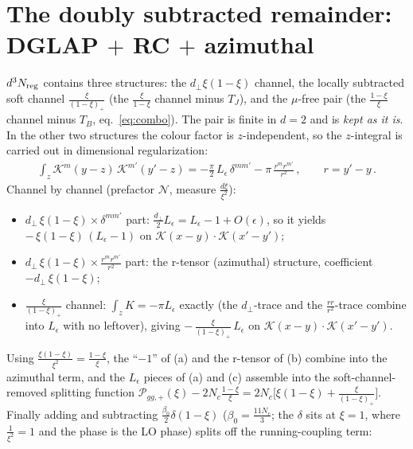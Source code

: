 \documentclass[9pt]{article}
\newcommand{\Leps}{L_{\epsilon}}
\newcommand{\KK}{\mathcal K(x-y)\!\cdot\!\mathcal K(x'-y')}
\begin{document}
\section{The doubly subtracted remainder: DGLAP $+$ RC $+$ azimuthal}
$d^{3}N_{\rm reg}$ contains three structures: the $d_{\perp}\xi(1-\xi)$ channel, the locally
subtracted soft channel $\frac{\xi}{(1-\xi)_{+}}$ (the $\frac{\xi}{1-\xi}$ channel minus
$T_{J}$), and the $\mu$-free pair (the $\frac{1-\xi}{\xi}$ channel minus $T_{B}$,
eq.~\eqref{eq:combo}). The pair is finite in $d=2$ and is \emph{kept as it is}. In the other
two structures the colour factor is $z$-independent, so the $z$-integral is carried out in
dimensional regularization:
\begin{align}
\int_{z}\mathcal K^{m}(y-z)\,\mathcal K^{m'}(y'-z)
=-\frac{\pi}{2}\,\Leps\,\delta^{mm'}-\pi\,\frac{r^{m}r^{m'}}{r^{2}}\,,\qquad r=y'-y\,.
\end{align}
Channel by channel (prefactor $\mathcal N$, measure $\frac{d\xi}{\xi^{2}}$):
\begin{itemize}
\item[(a)] $d_{\perp}\,\xi(1-\xi)\times\delta^{mm'}$ part:
$\frac{d_{\perp}}{2}\Leps=\Leps-1+O(\epsilon)$, so it yields
$-\,\xi(1-\xi)\,(\Leps-1)$ on $\KK$;
\item[(b)] $d_{\perp}\,\xi(1-\xi)\times\frac{r^{m}r^{m'}}{r^{2}}$ part: the r-tensor
(azimuthal) structure, coefficient $-d_{\perp}\,\xi(1-\xi)$;
\item[(c)] $\frac{\xi}{(1-\xi)_{+}}$ channel: $\int_{z}K=-\pi\Leps$ exactly (the
$d_{\perp}$-trace and the $\frac{r r}{r^{2}}$-trace combine into $\Leps$ with no leftover),
giving $-\,\frac{\xi}{(1-\xi)_{+}}\,\Leps$ on $\KK$.
\end{itemize}
Using $\frac{\xi(1-\xi)}{\xi^{2}}=\frac{1-\xi}{\xi}$, the ``$-1$'' of (a) and the r-tensor of
(b) combine into the azimuthal term, and the $\Leps$ pieces of (a) and (c) assemble into the
soft-channel-removed splitting function
$\mathcal P_{gg,+}(\xi)-2N_{c}\frac{1-\xi}{\xi}
=2N_{c}\big[\xi(1-\xi)+\frac{\xi}{(1-\xi)_{+}}\big]$. Finally adding and subtracting
$\frac{\beta_{0}}{2}\delta(1-\xi)$ ($\beta_{0}=\frac{11N_{c}}{3}$; the $\delta$ sits at
$\xi=1$, where $\frac{1}{\xi^{2}}=1$ and the phase is the LO phase) splits off the
running-coupling term:
\end{document}
